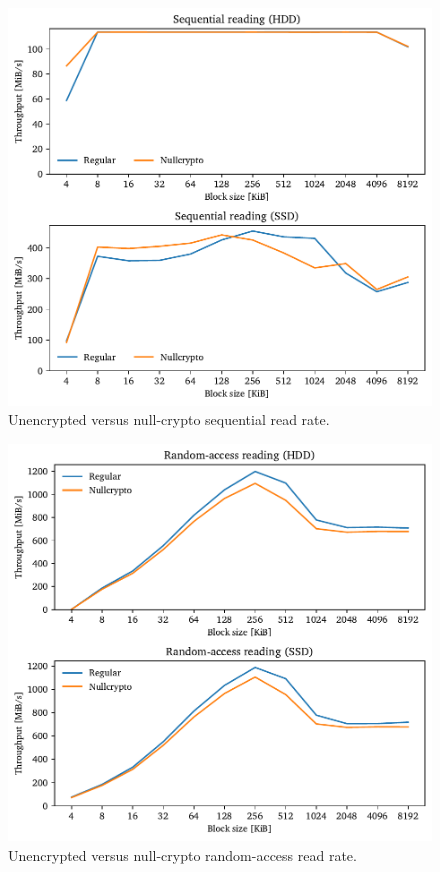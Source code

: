 \begin{figure}[htb!]
	\center
	\includegraphics[scale=1]{../fig/performance.hwexperiments.nullcryptoseq.pdf}
	\caption[
		Unencrypted versus null-crypto sequential read rate
	]{
		Unencrypted versus null-crypto sequential read rate. 
	}
	\label{fig:performance.hwexperiments.nullcryptoseq}
\end{figure}

\begin{figure}[htb!]
	\center
	\includegraphics[scale=1]{../fig/performance.hwexperiments.nullcryptorand.pdf}
	\caption[
		Unencrypted versus null-crypto random-access read rate
	]{
		Unencrypted versus null-crypto random-access read rate. 
	}
	\label{fig:performance.hwexperiments.nullcryptorand}
\end{figure}

